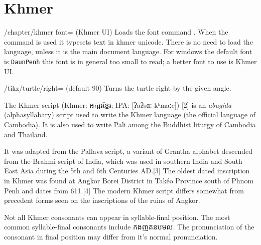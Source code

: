 \section{Khmer}
\newfontfamily{}
\normaltext

\def\khmerdefaultfont#1{\newfontfamily\khmer[Scale=MatchUppercase]{#1}}
\def\khmertext#1{{\khmer#1}}

\cxset{khmer font/.code=\khmerdefaultfont{#1}}



\begin{key}{/chapter/khmer font= (Khmer  UI)} Loads the font
command \cmd{\khmer}. When the command is used it typesets text in
khmer unicode. There is no need to load the language, unless it is the main document language. For windows the default font is \texttt{DaunPenh} this font is in general too small to read; a better font to use is Khmer UI.
\end{key}

\begin{key}{/tikz/turtle/right= (default 90)}
  Turns the turtle right by the given angle. 
\end{key}


The Khmer script (Khmer: {\Large\khmertext{អក្សរខ្មែរ}}; IPA: [ʔaʔsɑː kʰmaːe]) [2] is an \textit{abugida} (alphasyllabary) script used to write the Khmer language (the official language of Cambodia). It is also used to write Pali among the Buddhist liturgy of Cambodia and Thailand.

It was adapted from the Pallava script, a variant of Grantha alphabet descended from the Brahmi script of India, which was used in southern India and South East Asia during the 5th and 6th Centuries AD.[3] The oldest dated inscription in Khmer was found at Angkor Borei District in Takéo Province south of Phnom Penh and dates from 611.[4] The modern Khmer script differs somewhat from precedent forms seen on the inscriptions of the ruins of Angkor.

Not all Khmer consonants can appear in syllable-final position. The most common syllable-final consonants include {\khmer កងញតនបមល}. The pronunciation of the consonant in final position may differ from it's normal pronunciation.


